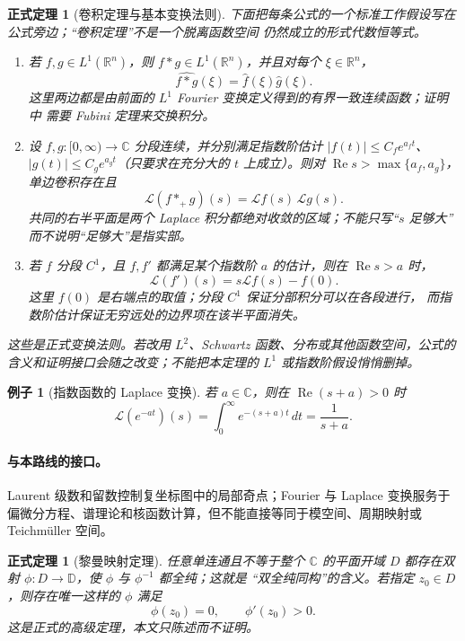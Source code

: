 \documentclass[UTF8,fontset=none,a4paper,11pt]{ctexart}
\theoremstyle{foundation-definition}
\theoremstyle{foundation-theorem}
\newtheorem{theorem}[definition]{正式定理}
\theoremstyle{foundation-proposition}
\theoremstyle{foundation-example}
\newtheorem{example}[definition]{例子}
\theoremstyle{foundation-remark}
\theoremstyle{foundation-theorem}
\newcommand{\C}{\mathbb C}
\begin{document}
\begin{theorem}[卷积定理与基本变换法则]
下面把每条公式的一个标准工作假设写在公式旁边；“卷积定理”不是一个脱离函数空间
仍然成立的形式代数恒等式。
\begin{enumerate}[label=(\roman*),leftmargin=2.5em]
  \item 若 \(f,g\in L^1(\mathbb R^n)\)，则 \(f*g\in L^1(\mathbb R^n)\)，并且对每个
  \(\xi\in\mathbb R^n\)，
  \[
  \widehat{f*g}(\xi)=\widehat f(\xi)\widehat g(\xi).
  \]
  这里两边都是由前面的 \(L^1\) Fourier 变换定义得到的有界一致连续函数；证明中
  需要 Fubini 定理来交换积分。
  \item 设 \(f,g:[0,\infty)\to\mathbb C\) 分段连续，并分别满足指数阶估计
  \(|f(t)|\leq C_f e^{a_ft}\)、\(|g(t)|\leq C_g e^{a_gt}\)（只要求在充分大的
  \(t\) 上成立）。则对
  \(\operatorname{Re}s>\max\{a_f,a_g\}\)，单边卷积存在且
  \[
  \mathcal L(f*_{+}g)(s)=\mathcal Lf(s)\,\mathcal Lg(s).
  \]
  共同的右半平面是两个 Laplace 积分都绝对收敛的区域；不能只写“\(s\) 足够大”
  而不说明“足够大”是指实部。
  \item 若 \(f\) 分段 \(C^1\)，且 \(f,f'\) 都满足某个指数阶 \(a\) 的估计，则在
  \(\operatorname{Re}s>a\) 时，
  \[
  \mathcal L(f')(s)=s\mathcal Lf(s)-f(0).
  \]
  这里 \(f(0)\) 是右端点的取值；分段 \(C^1\) 保证分部积分可以在各段进行，
  而指数阶估计保证无穷远处的边界项在该半平面消失。
\end{enumerate}
这些是正式变换法则。若改用 \(L^2\)、Schwartz 函数、分布或其他函数空间，公式的
含义和证明接口会随之改变；不能把本定理的 \(L^1\) 或指数阶假设悄悄删掉。
\end{theorem}

\begin{example}[指数函数的 Laplace 变换]
若 \(a\in\mathbb C\)，则在 \(\operatorname{Re}(s+a)>0\) 时
\[
\mathcal L(e^{-at})(s)=\int_0^\infty e^{-(s+a)t}\,dt
=\frac{1}{s+a}.
\]
\end{example}

\paragraph{与本路线的接口。}
Laurent 级数和留数控制复坐标图中的局部奇点；Fourier 与 Laplace 变换服务于偏微分方程、谱理论和核函数计算，但不能直接等同于模空间、周期映射或 Teichmüller 空间。

\begin{theorem}[黎曼映射定理]
任意单连通且不等于整个 \(\C\) 的平面开域 \(D\) 都存在双射
\(\phi:D\to\mathbb D\)，使 \(\phi\) 与 \(\phi^{-1}\) 都全纯；这就是
“双全纯同构”的含义。若指定 \(z_0\in D\)，则存在唯一这样的 \(\phi\) 满足
\[
\phi(z_0)=0,\qquad \phi'(z_0)>0.
\]
这是正式的高级定理，本文只陈述而不证明。
\end{theorem}
\end{document}
